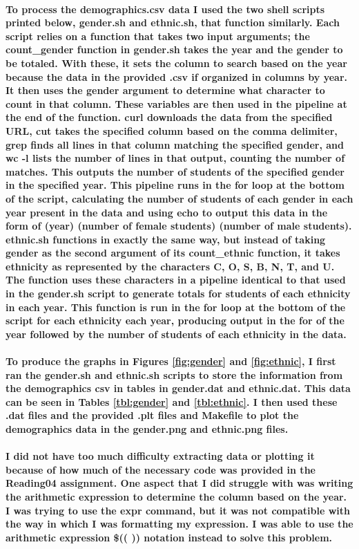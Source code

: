 \documentclass[letterpaper]{article}
\begin{document}
\paragraph{
To process the demographics.csv data I used the two shell scripts 
printed below, gender.sh and ethnic.sh, that function similarly.  Each script
relies on a function that takes two input arguments; the count\_gender 
function in gender.sh takes the year and the gender to be totaled.  With 
these, it sets the column to search based on the year because the data in the
provided .csv if organized in columns by year.  It then uses the gender 
argument to determine what character to count in that column.  These 
variables are then used in the pipeline at the end of the function.  curl 
downloads the data from the specified URL, cut takes the specified column 
based on the comma delimiter, grep finds all lines in that column matching 
the specified gender, and wc -l lists the number of lines in that output, 
counting the number of matches.  This outputs the number of students of the 
specified gender in the specified year.  This pipeline runs in the for loop 
at the bottom of the script, calculating the number of students of each 
gender in each year present in the data and using echo to output this data in
the form of (year) (number of female students) (number of male students).  ethnic.sh 
functions in exactly the same way, but instead of taking gender as the 
second argument of its count\_ethnic function, it takes ethnicity as
represented by the characters C, O, S, B, N, T, and U.  The function uses
these characters in a pipeline identical to that used in the gender.sh script
to generate totals for students of each ethnicity in each year.  This 
function is run in the for loop at the bottom of the script for each
ethnicity each year, producing output in the for of the year followed by 
the number of students of each ethnicity in the data.}
\paragraph{
To produce the graphs in Figures \ref{fig:gender} and \ref{fig:ethnic}, I first
ran the gender.sh and ethnic.sh scripts to store the information from the 
demographics csv in tables in gender.dat and ethnic.dat.  This data can be 
seen in Tables \ref{tbl:gender} and \ref{tbl:ethnic}.  I then used these .dat
files and the provided .plt files and Makefile to plot the demographics data
in the gender.png and ethnic.png files.}
\paragraph{
I did not have too much difficulty extracting data or plotting it 
because of how much of the necessary code was provided in the Reading04 
assignment.  One aspect that I did struggle with was writing the arithmetic
expression to determine the column based on the year.  I was trying to use
the expr command, but it was not compatible with the way in which I was
formatting my expression.  I was able to use the arithmetic expression
\$(( )) notation instead to solve this problem.}
\end{document}
